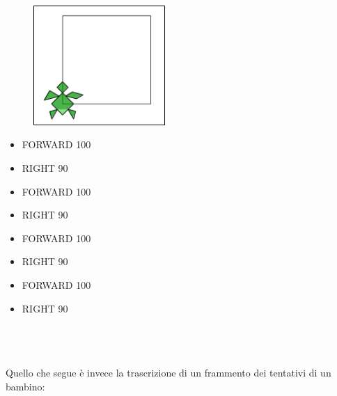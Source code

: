 \begin{minipage}{0.5\textwidth}
\begin{figure}[H]
   \includegraphics[width=5.0cm]{./images/papert-2/pap-2-1.png}
   \label{pap-2-1}
\end{figure}
\end{minipage} \hfill
\begin{minipage}{0.45\textwidth}
\begin{itemize}[itemsep=-3pt,parsep=2pt]
\item[] \hspace{0.5cm} FORWARD 100
\item[] \hspace{0.5cm} RIGHT 90
\item[] \hspace{0.5cm} FORWARD 100
\item[] \hspace{0.5cm} RIGHT 90
\item[] \hspace{0.5cm} FORWARD 100
\item[] \hspace{0.5cm} RIGHT 90
\item[] \hspace{0.5cm} FORWARD 100
\item[] \hspace{0.5cm} RIGHT 90
\end{itemize}
\end{minipage}
\\
\\
\\
Quello che segue è invece la trascrizione di un frammento dei tentativi di un bambino: 

